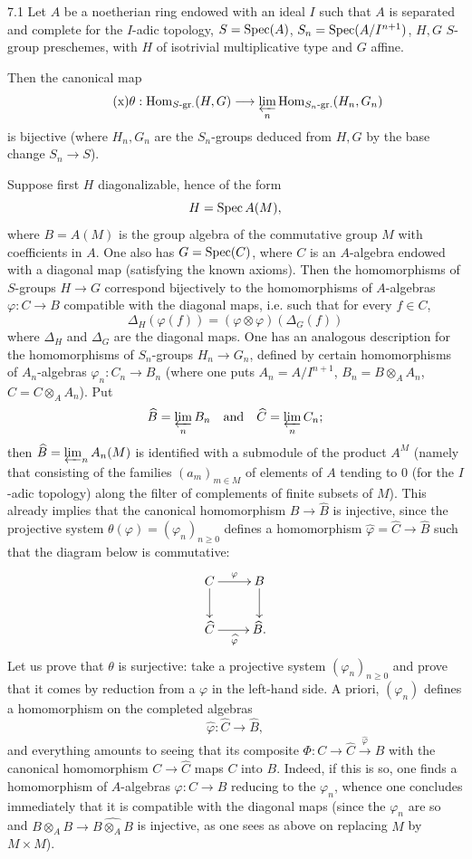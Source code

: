 \begin{theorem}{7.1}\label{IX.7.1}
Let $A$ be a noetherian ring endowed with an ideal $I$ such that $A$ is separated and complete for the $I$-adic topology, $S=\operatorname{Spec}(A)$, $S_n=\operatorname{Spec}(A/I^{n+1})$, $H,G$ $S$-group preschemes, with $H$ of isotrivial multiplicative type and $G$ affine.

Then the canonical map
\begin{equation}\tag{x}
\theta:\operatorname{Hom}_{S\text{-}\mathrm{gr.}}(H,G)\longrightarrow\varprojlim_n\operatorname{Hom}_{S_n\text{-}\mathrm{gr.}}(H_n,G_n)
\end{equation}
is bijective (where $H_n,G_n$ are the $S_n$-groups deduced from $H,G$ by the base change $S_n\to S$).
\end{theorem}
Suppose first $H$ diagonalizable, hence of the form
\[
H=\operatorname{Spec} A(M),
\]
where $B=A(M)$ is the group algebra of the commutative group $M$ with coefficients in $A$. One also has $G=\operatorname{Spec}(C)$, where $C$ is an $A$-algebra endowed with a diagonal map (satisfying the known axioms). Then the homomorphisms of $S$-groups $H\to G$ correspond bijectively to the homomorphisms of $A$-algebras $\varphi:C\to B$ compatible with the diagonal maps, i.e. such that for every $f\in C$,
\[
\Delta_H(\varphi(f))=(\varphi\otimes\varphi)(\Delta_G(f))
\]
where $\Delta_H$ and $\Delta_G$ are the diagonal maps. One has an analogous description for the homomorphisms of $S_n$-groups $H_n\to G_n$, defined by certain homomorphisms of $A_n$-algebras $\varphi_n:C_n\to B_n$ (where one puts $A_n=A/I^{n+1}$, $B_n=B\otimes_A A_n$, $C=C\otimes_A A_n$). Put
\[
\widehat B=\varprojlim_n B_n\quad\text{and}\quad\widehat C=\varprojlim_n C_n;
\]
then $\widehat B=\varprojlim_n A_n(M)$ is identified with a submodule of the product $A^M$ (namely that consisting of the families $(a_m)_{m\in M}$ of elements of $A$ tending to 0 (for the $I$-adic topology) along the filter of complements of finite subsets of $M$). This already implies that the canonical homomorphism $B\to\widehat B$ is injective, since the projective system $\theta(\varphi)=(\varphi_n)_{n\geq0}$ defines a homomorphism $\widehat\varphi=\widehat C\to\widehat B$ such that the diagram below is commutative:
\[
\xymatrix{C\ar[r]^\varphi\ar[d]&B\ar[d]\\\widehat C\ar[r]_{\widehat\varphi}&\widehat B.}
\]
Let us prove that $\theta$ is surjective: take a projective system $(\varphi_n)_{n\geq0}$ and prove that it comes by reduction from a $\varphi$ in the left-hand side. A priori, $(\varphi_n)$ defines a homomorphism on the completed algebras
\[
\widehat\varphi:\widehat C\to\widehat B,
\]
and everything amounts to seeing that its composite $\Phi:C\to\widehat C\xrightarrow{\widehat\varphi}\widehat B$ with the canonical homomorphism $C\to\widehat C$ maps $C$ into $B$. Indeed, if this is so, one finds a homomorphism of $A$-algebras $\varphi:C\to B$ reducing to the $\varphi_n$, whence one concludes immediately that it is compatible with the diagonal maps (since the $\varphi_n$ are so and $B\otimes_A B\to\widehat{B\otimes_A B}$ is injective, as one sees as above on replacing $M$ by $M\times M$).

